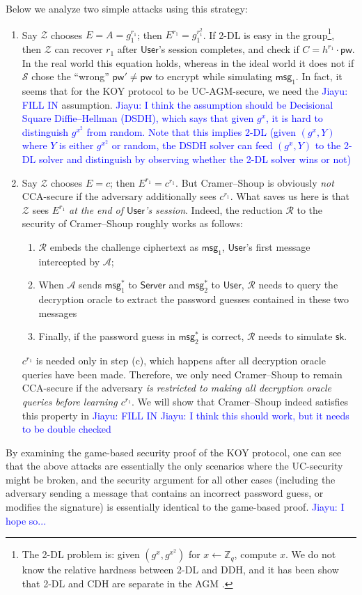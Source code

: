 \documentclass[12pt,a4paper]{article}
\newcommand{\simulator}{\mathcal{S}}
\newcommand{\env}{\mathcal{Z}}
\newcommand{\adv}{\mathcal{A}}
\newcommand{\red}{\mathcal{R}}
\newcommand{\user}{\mathsf{User}}
\newcommand{\sk}{\mathsf{sk}}
\newcommand{\pw}{\mathsf{pw}}
\newcommand{\server}{\mathsf{Server}}
\newcommand{\msg}[1]{\mathsf{msg}_{#1}}
\def\xjy#1{\textcolor{blue}{Jiayu: #1}}
\begin{document}
Below we analyze two simple attacks using this strategy:
\begin{enumerate}
  \item Say $\env$ chooses $E = A = g_1^{r_1}$; then $E^{r_1} = g_1^{r_1^2}$. If 2-DL is easy in the group\footnote{The 2-DL problem is: given $(g^x,g^{x^2})$ for $x \gets \mathbb{Z}_q$, compute $x$. We do not know the relative hardness between 2-DL and DDH, and it has been show that 2-DL and CDH are separate in the AGM \cite{C:BauFucLos20}.}, then $\env$ can recover $r_1$ after $\user$'s session completes, and check if $C = h^{r_1} \cdot \pw$. In the real world this equation holds, whereas in the ideal world it does not if $\simulator$ chose the ``wrong'' $\pw' \neq \pw$ to encrypt while simulating $\msg{1}$. In fact, it seems that for the KOY protocol to be UC-AGM-secure, we need the \xjy{FILL IN} assumption. \xjy{I think the assumption should be Decisional Square Diffie--Hellman (DSDH), which says that given $g^x$, it is hard to distinguish $g^{x^2}$ from random. Note that this implies 2-DL (given $(g^x,Y)$ where $Y$ is either $g^{x^2}$ or random, the DSDH solver can feed $(g^x,Y)$ to the 2-DL solver and distinguish by observing whether the 2-DL solver wins or not)}
  \item Say $\env$ chooses $E = c$; then $E^{r_1} = c^{r_1}$. But Cramer--Shoup is obviously \emph{not} CCA-secure if the adversary additionally sees $c^{r_1}$. What saves us here is that $\env$ sees $E^{r_1}$ \emph{at the end of $\user$'s session}. Indeed, the reduction $\red$ to the security of Cramer--Shoup roughly works as follows:
      \begin{enumerate}
        \item $\red$ embeds the challenge ciphertext as $\msg{1}$, $\user$'s first message intercepted by $\adv$;
        \item When $\adv$ sends $\msg{1}^*$ to $\server$ and $\msg{2}^*$ to $\user$, $\red$ needs to query the decryption oracle to extract the password guesses contained in these two messages
        \item Finally, if the password guess in $\msg{2}^*$ is correct, $\red$ needs to simulate $\sk$.
      \end{enumerate}
      $c^{r_1}$ is needed only in step (c), which happens after all decryption oracle queries have been made. Therefore, we only need Cramer--Shoup to remain CCA-secure if the adversary \emph{is restricted to making all decryption oracle queries before learning $c^{r_1}$}. We will show that Cramer--Shoup indeed satisfies this property in \xjy{FILL IN} \xjy{I think this should work, but it needs to be double checked}
\end{enumerate}
By examining the game-based security proof of the KOY protocol, one can see that the above attacks are essentially the only scenarios where the UC-security might be broken, and the security argument for all other cases (including the adversary sending a message that contains an incorrect password guess, or modifies the signature) is essentially identical to the game-based proof. \xjy{I hope so...}
\end{document}
